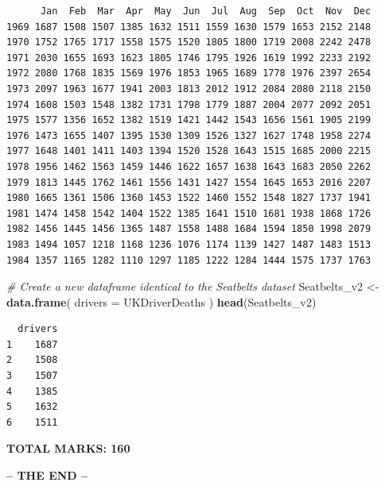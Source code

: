 \documentclass[
  10t,
]{article}
\newenvironment{Shaded}{\begin{snugshade}}{\end{snugshade}}
\newcommand{\AttributeTok}[1]{\textcolor[rgb]{0.13,0.29,0.53}{#1}}
\newcommand{\CommentTok}[1]{\textcolor[rgb]{0.56,0.35,0.01}{\textit{#1}}}
\newcommand{\FunctionTok}[1]{\textcolor[rgb]{0.13,0.29,0.53}{\textbf{#1}}}
\newcommand{\NormalTok}[1]{#1}
\newcommand{\OtherTok}[1]{\textcolor[rgb]{0.56,0.35,0.01}{#1}}
\begin{document}
\begin{verbatim}
      Jan  Feb  Mar  Apr  May  Jun  Jul  Aug  Sep  Oct  Nov  Dec
1969 1687 1508 1507 1385 1632 1511 1559 1630 1579 1653 2152 2148
1970 1752 1765 1717 1558 1575 1520 1805 1800 1719 2008 2242 2478
1971 2030 1655 1693 1623 1805 1746 1795 1926 1619 1992 2233 2192
1972 2080 1768 1835 1569 1976 1853 1965 1689 1778 1976 2397 2654
1973 2097 1963 1677 1941 2003 1813 2012 1912 2084 2080 2118 2150
1974 1608 1503 1548 1382 1731 1798 1779 1887 2004 2077 2092 2051
1975 1577 1356 1652 1382 1519 1421 1442 1543 1656 1561 1905 2199
1976 1473 1655 1407 1395 1530 1309 1526 1327 1627 1748 1958 2274
1977 1648 1401 1411 1403 1394 1520 1528 1643 1515 1685 2000 2215
1978 1956 1462 1563 1459 1446 1622 1657 1638 1643 1683 2050 2262
1979 1813 1445 1762 1461 1556 1431 1427 1554 1645 1653 2016 2207
1980 1665 1361 1506 1360 1453 1522 1460 1552 1548 1827 1737 1941
1981 1474 1458 1542 1404 1522 1385 1641 1510 1681 1938 1868 1726
1982 1456 1445 1456 1365 1487 1558 1488 1684 1594 1850 1998 2079
1983 1494 1057 1218 1168 1236 1076 1174 1139 1427 1487 1483 1513
1984 1357 1165 1282 1110 1297 1185 1222 1284 1444 1575 1737 1763
\end{verbatim}

\begin{Shaded}
\begin{Highlighting}[]
\CommentTok{\# Create a new dataframe identical to the Seatbelts dataset}
\NormalTok{Seatbelts\_v2 }\OtherTok{\textless{}{-}} \FunctionTok{data.frame}\NormalTok{(}
  \AttributeTok{drivers =}\NormalTok{ UKDriverDeaths}
\NormalTok{)}
\FunctionTok{head}\NormalTok{(Seatbelts\_v2)}
\end{Highlighting}
\end{Shaded}

\begin{verbatim}
  drivers
1    1687
2    1508
3    1507
4    1385
5    1632
6    1511
\end{verbatim}

\textbf{TOTAL MARKS: 160}

\textbf{-- THE END --}
\end{document}
